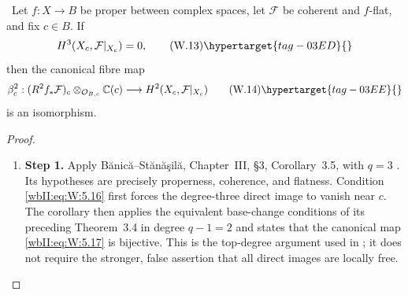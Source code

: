 \begin{proposition}
\hypertarget{tag-03II}{}\label{wbII:prop:analytic-base-change}

\ Let $f:X\to B$ be proper between complex spaces, let
$\mathcal F$ be coherent and $f$-flat, and fix $c\in B$.  If
\[
H^3(X_c,\mathcal F|_{X_c})=0,
\tag{W.13}\hypertarget{tag-03ED}{}\label{wbII:eq:W:5.16}
\]
then the canonical fibre map
\[
\beta_c^2:
(R^2f_*\mathcal F)_c\otimes_{\mathcal O_{B,c}}\mathbb C(c)
\longrightarrow H^2(X_c,\mathcal F|_{X_c})
\tag{W.14}\hypertarget{tag-03EE}{}\label{wbII:eq:W:5.17}
\]
is an isomorphism.
\end{proposition}



\begin{proof}
\begin{enumerate}[label={$\langle1\rangle$\arabic*.},leftmargin=*]
\item 
\noindent\textbf{Step 1.} Apply B\u{a}nic\u{a}--St\u{a}n\u{a}\c{s}il\u{a},
Chapter~III, \S3, Corollary~3.5, with $q=3$
\cite[pp.~120--121]{BS76push}.  Its hypotheses are precisely
properness, coherence, and flatness.  Condition \eqref{wbII:eq:W:5.16} first forces the
degree-three direct image to vanish near $c$.  The corollary then applies the
equivalent base-change conditions of its preceding Theorem~3.4 in degree
$q-1=2$ and states that the canonical map \eqref{wbII:eq:W:5.17} is bijective.  This is the
top-degree argument used in \cite[Lemma~1.5]{CDP98}; it does not require
the stronger, false assertion that all direct images are locally free.

\end{enumerate}
\end{proof}